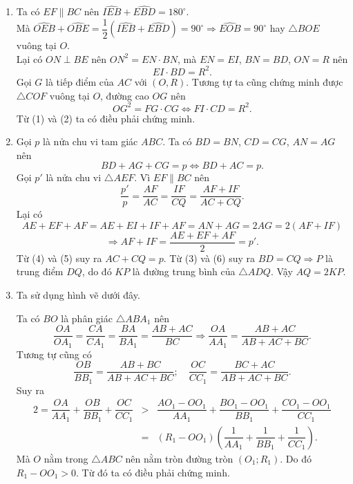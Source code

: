 \begin{ex}
{\begin{enumerate}
\item Ta có $EF\parallel BC$ nên $\widehat{IEB}+\widehat{EBD}=180^\circ$.\\
Mà $\widehat{OEB}+\widehat{OBE}=\dfrac{1}{2}\left(\widehat{IEB}+\widehat{EBD}\right)=90^\circ\Rightarrow \widehat{EOB}=90^\circ$ hay $\triangle BOE$ vuông tại $O$.\\
Lại có $ON\perp BE$ nên $ON^2=EN\cdot BN$, mà $EN=EI$, $BN=BD$, $ON=R$ nên \[EI\cdot BD=R^2.\tag{1}\]
Gọi $G$ là tiếp điểm của $AC$ với $(O,R)$. Tương tự ta cũng chứng minh được $\triangle COF$ vuông tại $O$, đường cao $OG$ nên \[OG^2=FG\cdot CG\Leftrightarrow FI\cdot CD=R^2.\tag{2}\]
Từ (1) và (2) ta có điều phải chứng minh.
\item Gọi $p$ là nửa chu vi tam giác $ABC$. Ta có $BD=BN$, $CD=CG$, $AN=AG$ nên \[BD+AG+CG=p\Leftrightarrow BD+AC=p.\tag{3}\]
Gọi $p'$ là nửa chu vi $\triangle AEF$. Vì $EF\parallel BC$ nên \[\dfrac{p'}{p}=\dfrac{AF}{AC}=\dfrac{IF}{CQ}=\dfrac{AF+IF}{AC+CQ}.\tag{4}\]
Lại có 
\[AE+EF+AF=AE+EI+IF+AF=AN+AG=2AG=2(AF+IF)\]
\[\Rightarrow AF+IF=\dfrac{AE+EF+AF}{2}=p'.\tag{5}\]
Từ (4) và (5) suy ra $AC+CQ=p$.
Từ (3) và (6) suy ra $BD=CQ\Rightarrow P$ là trung điểm $DQ$, do đó $KP$ là đường trung bình của $\triangle ADQ$. Vậy $AQ=2KP$.
\item Ta sử dụng hình vẽ dưới đây.
\begin{center}
\end{center}
Ta có $BO$ là phân giác $\triangle ABA_1$ nên
$$\dfrac{OA}{OA_1}=\dfrac{CA}{CA_1}=\dfrac{BA}{BA_1}=\dfrac{AB+AC}{BC}\Rightarrow \dfrac{OA}{AA_1}=\dfrac{AB+AC}{AB+AC+BC}.$$
Tương tự cũng có
$$\dfrac{OB}{BB_1}=\dfrac{AB+BC}{AB+AC+BC};\quad \dfrac{OC}{CC_1}=\dfrac{BC+AC}{AB+AC+BC}.$$
Suy ra
\begin{eqnarray*}
2=\dfrac{OA}{AA_1}+\dfrac{OB}{BB_1}+\dfrac{OC}{CC_1}
& > & \dfrac{AO_1-OO_1}{AA_1}+\dfrac{BO_1-OO_1}{BB_1}+\dfrac{CO_1-OO_1}{CC_1}\\
& = & \left(R_1-OO_1\right)\left(\dfrac{1}{AA_1}+\dfrac{1}{BB_1}+\dfrac{1}{CC_1}\right).
\end{eqnarray*}
Mà $O$ nằm trong $\triangle ABC$ nên nằm tròn đường tròn $(O_1;R_1)$. Do đó $R_1-OO_1>0$. Từ đó ta có điều phải chứng minh.
\end{enumerate}
}
\end{ex}

